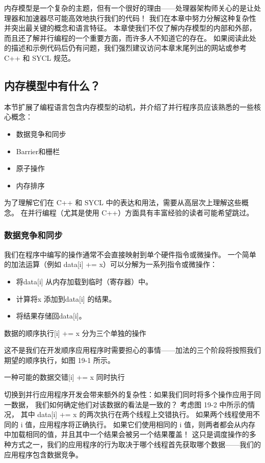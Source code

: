 内存模型是一个复杂的主题，但有一个很好的理由——处理器架构师关心的是让处理器和加速器尽可能高效地执行我们的代码！ 
我们在本章中努力分解这种复杂性并突出最关键的概念和语言特征。 
本章使我们不仅了解内存模型的内部和外部，而且还了解并行编程的一个重要方面，而许多人不知道它的存在。 
如果阅读此处的描述和示例代码后仍有问题，我们强烈建议访问本章末尾列出的网站或参考 C++ 和 SYCL 规范。

\subsection{内存模型中有什么？}
本节扩展了编程语言包含内存模型的动机，并介绍了并行程序员应该熟悉的一些核心概念：

\begin{itemize}
	\item 数据竞争和同步

	\item Barrier和栅栏

	\item 原子操作

	\item 内存排序
\end{itemize}

为了理解它们在 C++ 和 SYCL 中的表达和用法，需要从高层次上理解这些概念。 
在并行编程（尤其是使用 C++）方面具有丰富经验的读者可能希望跳过。

\subsubsection{数据竞争和同步}
我们在程序中编写的操作通常不会直接映射到单个硬件指令或微操作。 
一个简单的加法运算（例如 data[i] += x）可以分解为一系列指令或微操作：

\begin{itemize}
	\item 将data[i] 从内存加载到临时（寄存器）中。

	\item 计算将x 添加到data[i] 的结果。

	\item 将结果存储回data[i]。
\end{itemize}

{\color{red} 数据的顺序执行[i] += x 分为三个单独的操作}

这不是我们在开发顺序应用程序时需要担心的事情——加法的三个阶段将按照我们期望的顺序执行，如图 19-1 所示。

{\color{red} 一种可能的数据交错[i] += x 同时执行}

切换到并行应用程序开发会带来额外的复杂性：如果我们同时将多个操作应用于同一数据，
我们如何确定他们对该数据的看法是一致的？ 考虑图 19-2 中所示的情况，
其中 data[i] += x 的两次执行在两个线程上交错执行。 如果两个线程使用不同的 i 值，应用程序将正确执行。 
如果它们使用相同的 i 值，则两者都会从内存中加载相同的值，并且其中一个结果会被另一个结果覆盖！
 这只是调度操作的多种方式之一，我们的应用程序的行为取决于哪个线程首先获取哪个数据——我们的应用程序包含数据竞争。
 
